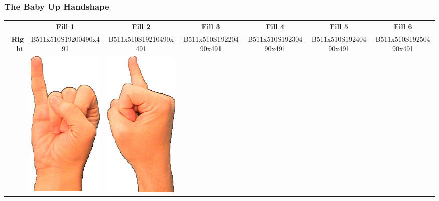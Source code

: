 \documentclass{article}
\begin{document}
\subsubsection{The Baby Up Handshape}

\begin{center}
\begin{tabular}{r*{6}{c}}
&\textbf{Fill 1}&\textbf{Fill 2}&\textbf{Fill 3}&\textbf{Fill 4}&\textbf{Fill 5}&\textbf{Fill 6}\\
\multirow{2}{*}{\textbf{Right}}&
B511x510S19200490x491&
B511x510S19210490x491&
B511x510S19220490x491&
B511x510S19230490x491&
B511x510S19240490x491&
B511x510S19250490x491\\
&
\includegraphics[scale=0.1]{images/06-06-1.jpg}&
\includegraphics[scale=0.1]{images/06-06-2.jpg}&

\end{tabular}
\end{center}
\end{document}
